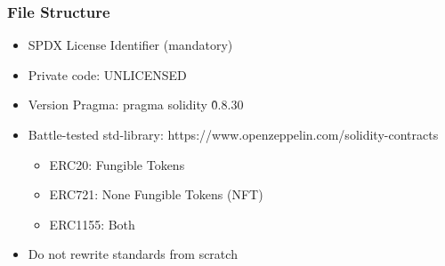 \documentclass[../Main.tex]{subfiles}
\begin{document}
\subsubsection{File Structure}
\begin{itemize}
    \item SPDX License Identifier (mandatory)
    \item Private code: UNLICENSED
    \item Version Pragma: pragma solidity \^ 0.8.30
    \item Battle-tested std-library: https://www.openzeppelin.com/solidity-contracts
    \begin{itemize}
        \item ERC20: Fungible Tokens
        \item ERC721: None Fungible Tokens (NFT)
        \item ERC1155: Both
    \end{itemize}
    \item Do not rewrite standards from scratch
\end{itemize}
\end{document}
